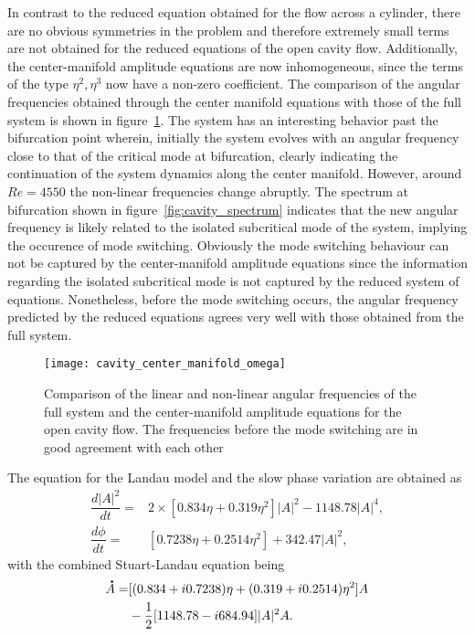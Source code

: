 In contrast to the reduced equation obtained for the flow across a cylinder, there are no obvious symmetries in the problem and therefore extremely small terms are not obtained for the reduced equations of the open cavity flow. Additionally, the center-manifold amplitude equations are now inhomogeneous, since the terms of the type $\eta^{2}, \eta^{3}$ now have a non-zero coefficient.  The comparison of the angular frequencies obtained through the center manifold equations with those of the full system is shown in figure~\ref{fig:cavity_limit_cycle_frequency}. The system has an interesting behavior past the bifurcation point wherein, initially the system evolves with an angular frequency close to that of the critical mode at bifurcation, clearly indicating the continuation of the system dynamics along the center manifold. However, around $Re=4550$ the non-linear frequencies change abruptly. The spectrum at bifurcation shown in figure~\ref{fig:cavity_spectrum} indicates that the new angular frequency is likely related to the isolated subcritical mode of the system, implying the occurence of mode switching. Obviously the mode switching behaviour can not be captured by the center-manifold amplitude equations since the information regarding the isolated subcritical mode is not captured by the reduced system of equations. Nonetheless, before the mode switching occurs, the angular frequency predicted by the reduced equations agrees very well with those obtained from the full system. 
\begin{figure}
	\centering
	\texttt{[image: cavity\_center\_manifold\_omega]}
	\caption{Comparison of the linear and non-linear angular frequencies of the full system and the center-manifold amplitude equations for the open cavity flow. The frequencies before the mode switching are in good agreement with each other}
	\label{fig:cavity_limit_cycle_frequency}
\end{figure}

The equation for the Landau model and the slow phase variation are obtained as 
\begin{align}
	\label{cavity_landau_eqn_1}
		\dfrac{d|A|^{2}}{dt} =& 2\times[0.834\eta + 0.319\eta^{2}] |A|^{2} - 1148.78|A|^{4}, \\
	\label{cavity_landau_eqn_2}
	\dfrac{d\phi}{dt} =& [0.7238\eta + 0.2514\eta^{2}]  + 342.47|A|^{2},
\end{align}
with the combined Stuart-Landau equation being
\begin{eqnarray}
	\label{cavity_stuart_landau_eqn}
	\begin{split}
		\accentset{\mbox{\large\bfseries .}}{A} 					=& [(0.834 + i0.7238)\eta + (0.319 + i0.2514)\eta^{2}] A \\
										& - \frac{1}{2}[1148.78 - i684.94]|A|^{2}A.
	\end{split}
\end{eqnarray}

